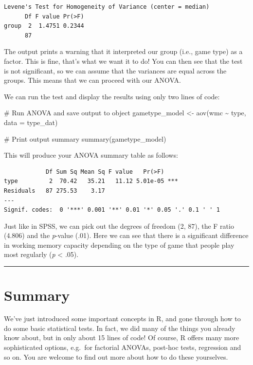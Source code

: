 \documentclass[
  a4paper,
  DIV=11,
  numbers=noendperiod]{scrreprt}
\newenvironment{Shaded}{\begin{snugshade}}{\end{snugshade}}
\newcommand{\AttributeTok}[1]{\textcolor[rgb]{0.40,0.45,0.13}{#1}}
\newcommand{\CommentTok}[1]{\textcolor[rgb]{0.37,0.37,0.37}{#1}}
\newcommand{\FunctionTok}[1]{\textcolor[rgb]{0.28,0.35,0.67}{#1}}
\newcommand{\NormalTok}[1]{\textcolor[rgb]{0.00,0.23,0.31}{#1}}
\newcommand{\OtherTok}[1]{\textcolor[rgb]{0.00,0.23,0.31}{#1}}
\newcommand{\SpecialCharTok}[1]{\textcolor[rgb]{0.37,0.37,0.37}{#1}}
\begin{document}
\begin{verbatim}
Levene's Test for Homogeneity of Variance (center = median)
      Df F value Pr(>F)
group  2  1.4751 0.2344
      87               
\end{verbatim}

The output prints a warning that it interpreted our group (i.e., game
type) as a factor. This is fine, that's what we want it to do! You can
then see that the test is not significant, so we can assume that the
variances are equal across the groups. This means that we can proceed
with our ANOVA.

We can run the test and display the results using only two lines of
code:

\begin{Shaded}
\begin{Highlighting}[]
\CommentTok{\# Run ANOVA and save output to object}
\NormalTok{gametype\_model }\OtherTok{\textless{}{-}} \FunctionTok{aov}\NormalTok{(wmc }\SpecialCharTok{\textasciitilde{}}\NormalTok{ type, }\AttributeTok{data =}\NormalTok{ type\_dat)}

\CommentTok{\# Print output summary}
\FunctionTok{summary}\NormalTok{(gametype\_model)}
\end{Highlighting}
\end{Shaded}

This will produce your ANOVA summary table as follows:

\begin{verbatim}
            Df Sum Sq Mean Sq F value   Pr(>F)    
type         2  70.42   35.21   11.12 5.01e-05 ***
Residuals   87 275.53    3.17                     
---
Signif. codes:  0 '***' 0.001 '**' 0.01 '*' 0.05 '.' 0.1 ' ' 1
\end{verbatim}

Just like in SPSS, we can pick out the degrees of freedom (2, 87), the F
ratio (4.806) and the \emph{p}-value (.01). Here we can see that there
is a significant difference in working memory capacity depending on the
type of game that people play most regularly (\emph{p} \textless{} .05).

\begin{center}\rule{0.5\linewidth}{0.5pt}\end{center}

\chapter{Summary}\label{summary}

We've just introduced some important concepts in R, and gone through how
to do some basic statistical tests. In fact, we did many of the things
you already know about, but in only about 15 lines of code! Of course, R
offers many more sophisticated options, e.g.~for factorial ANOVAs,
post-hoc tests, regression and so on. You are welcome to find out more
about how to do these yourselves.
\end{document}
